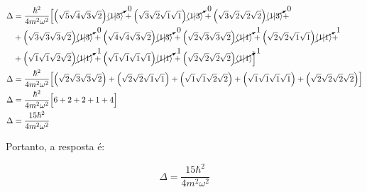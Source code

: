 \documentclass[a4paper,12pt]{article}
\begin{document}
\begin{align*}
\Delta &= \dfrac{\hbar^2}{4m^2\omega^2}\Big[\Big(\sqrt{5}\sqrt{4}\sqrt{3}\sqrt{2}\Big)\cancelto{0}{\langle 1|5\rangle}+\Big(\sqrt{3}\sqrt{2}\sqrt{1}\sqrt{1}\Big)\cancelto{0}{\langle 1|3\rangle}+\Big(\sqrt{3}\sqrt{2}\sqrt{2}\sqrt{2}\Big)\cancelto{0}{\langle 1|3\rangle}+\\
&+\Big(\sqrt{3}\sqrt{3}\sqrt{3}\sqrt{2}\Big)\cancelto{0}{\langle 1|3\rangle}+\Big(\sqrt{4}\sqrt{4}\sqrt{3}\sqrt{2}\Big)\cancelto{0}{\langle 1|3\rangle}+\Big(\sqrt{2}\sqrt{3}\sqrt{3}\sqrt{2}\Big)\cancelto{1}{\langle 1|1\rangle}+\Big(\sqrt{2}\sqrt{2}\sqrt{1}\sqrt{1}\Big)\cancelto{1}{\langle 1|1\rangle}+\\
&+\Big(\sqrt{1}\sqrt{1}\sqrt{2}\sqrt{2}\Big)\cancelto{1}{\langle 1|1\rangle}+\Big(\sqrt{1}\sqrt{1}\sqrt{1}\sqrt{1}\Big)\cancelto{1}{\langle 1|1\rangle}+\Big(\sqrt{2}\sqrt{2}\sqrt{2}\sqrt{2}\Big)\cancelto{1}{\langle 1|1\rangle}\Big]\\
\Delta &= \dfrac{\hbar^2}{4m^2\omega^2}\Big[\Big(\sqrt{2}\sqrt{3}\sqrt{3}\sqrt{2}\Big)+\Big(\sqrt{2}\sqrt{2}\sqrt{1}\sqrt{1}\Big)+\Big(\sqrt{1}\sqrt{1}\sqrt{2}\sqrt{2}\Big)+\Big(\sqrt{1}\sqrt{1}\sqrt{1}\sqrt{1}\Big)+\Big(\sqrt{2}\sqrt{2}\sqrt{2}\sqrt{2}\Big)\Big]\\
\Delta &= \dfrac{\hbar^2}{4m^2\omega^2}\Big[6+2+2+1+4\Big]\\
\Delta &= \dfrac{15\hbar^2}{4m^2\omega^2}
\end{align*}

Portanto, a resposta é:

$$\Delta = \dfrac{15\hbar^2}{4m^2\omega^2}$$
\end{document}
